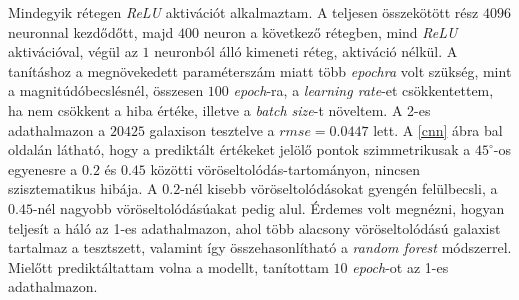 \documentclass[12pt,letterpaper,oneside,openright]{book}
\begin{document}
Mindegyik rétegen \textit{ReLU} aktivációt alkalmaztam. A teljesen összekötött rész $\num{4096}$ neuronnal kezdődőtt, majd $400$ neuron a következő rétegben, mind \textit{ReLU} aktivációval, végül az $1$ neuronból álló kimeneti réteg, aktiváció nélkül.
 \newline \indent
A tanításhoz a megnövekedett paraméterszám miatt több \textit{epochra} volt szükség, mint a magnitúdóbecslésnél, összesen $100$ \textit{epoch}-ra, a \textit{learning rate}-et  csökkentettem, ha nem csökkent a hiba értéke, illetve a \textit{batch size}-t növeltem. A 2-es adathalmazon a $\num{20425}$ galaxison tesztelve a $\textit{rmse} = 0.0447$ lett. A \ref{cnn} ábra bal oldalán látható, hogy a prediktált értékeket jelölő pontok szimmetrikusak a $45^{\circ}$-os egyenesre a $0.2$ és $0.45$ közötti vöröseltolódás-tartományon, nincsen szisztematikus hibája. A $0.2$-nél kisebb vöröseltolódásokat gyengén felülbecsli, a $0.45$-nél nagyobb vöröseltolódásúakat pedig alul. Érdemes volt megnézni, hogyan teljesít a háló az 1-es adathalmazon, ahol több alacsony vöröseltolódású galaxist tartalmaz a tesztszett, valamint így összehasonlítható a \textit{random forest} módszerrel. Mielőtt prediktáltattam volna a modellt, tanítottam $10$ \textit{epoch}-ot az 1-es adathalmazon.
\end{document}
